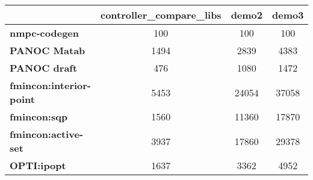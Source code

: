 \begin{tiny}\begin{tabular}{|l|c|c|c|}
\hline
&\textbf{controller_compare_libs}&\textbf{demo2}&\textbf{demo3}\\\hline
\textbf{nmpc-codegen}&100&100&100\\\hline
\textbf{PANOC Matab}&1494&2839&4383\\\hline
\textbf{PANOC draft}&476&1080&1472\\\hline
\textbf{fmincon:interior-point}&5453&24054&37058\\\hline
\textbf{fmincon:sqp}&1560&11360&17870\\\hline
\textbf{fmincon:active-set}&3937&17860&29378\\\hline
\textbf{OPTI:ipopt}&1637&3362&4952\\\hline
\end{tabular}
\end{tiny}